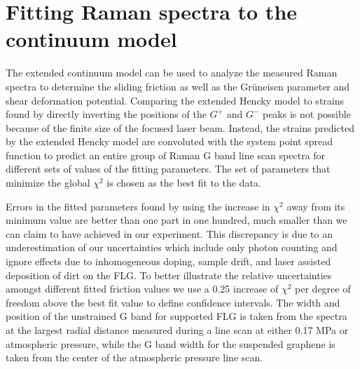 \section{Fitting Raman spectra to the continuum model}
The extended continuum model can be used to analyze the measured Raman spectra to determine the sliding friction as well as the Gr\"{u}neisen parameter and shear deformation potential.  Comparing the extended Hencky model to strains found by directly inverting the positions of the $G^+$ and $G^-$ peaks is not possible because of the finite size of the focused laser beam.  Instead, the strains predicted by the extended Hencky model are convoluted with the system point spread function to predict an entire group of Raman G band line scan spectra for different sets of values of the fitting parameters.  The set of parameters that minimize the global $\chi^2$ is chosen as the best fit to the data.

 Errors in the fitted parameters found by using the increase in $\chi^2$ away from its minimum value\cite{Press2007} are better than one part in one hundred, much smaller than we can claim to have achieved in our experiment.  This discrepancy is due to an underestimation of our uncertainties which include only photon counting and ignore effects due to inhomogeneous doping, sample drift, and laser assisted deposition of dirt on the FLG.  To better illustrate the relative uncertainties amongst different fitted friction values we use a 0.25 increase of $\chi^2$ per degree of freedom above the best fit value to define confidence intervals.  The width and position of the unstrained G band for supported FLG is taken from the spectra at the largest radial distance measured during a line scan at either 0.17 MPa or atmospheric pressure, while the G band width for the suspended graphene is taken from the center of the atmospheric pressure line scan.

